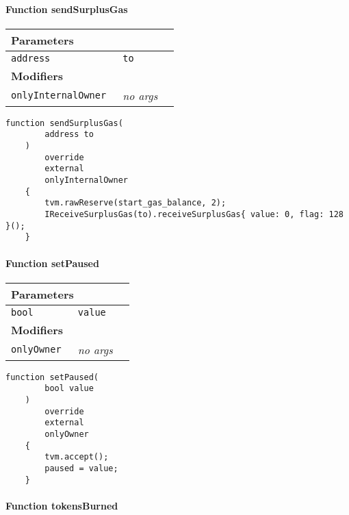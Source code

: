 \paragraph{Function sendSurplusGas}


\ifsoltables
\noindent\begin{tabular}{|l|l|p{5cm}|}\hline
\multicolumn{3}{|l|}{\bf Parameters}\\\hline
\tt address & \tt to &\\\hline
\multicolumn{3}{|l|}{\bf Modifiers}\\\hline
\tt onlyInternalOwner & {\em no args} &\\\hline
\end{tabular}
\fi

\vspace{2cm}

\begin{lstlisting}[firstnumber=386]
    function sendSurplusGas(
        address to
    )
        override
        external
        onlyInternalOwner
    {
        tvm.rawReserve(start_gas_balance, 2);
        IReceiveSurplusGas(to).receiveSurplusGas{ value: 0, flag: 128 }();
    }
\end{lstlisting}

\paragraph{Function setPaused}


\ifsoltables
\noindent\begin{tabular}{|l|l|p{5cm}|}\hline
\multicolumn{3}{|l|}{\bf Parameters}\\\hline
\tt bool & \tt value &\\\hline
\multicolumn{3}{|l|}{\bf Modifiers}\\\hline
\tt onlyOwner & {\em no args} &\\\hline
\end{tabular}
\fi

\vspace{2cm}

\begin{lstlisting}[firstnumber=407]
    function setPaused(
        bool value
    )
        override
        external
        onlyOwner
    {
        tvm.accept();
        paused = value;
    }
\end{lstlisting}

\paragraph{Function tokensBurned}


